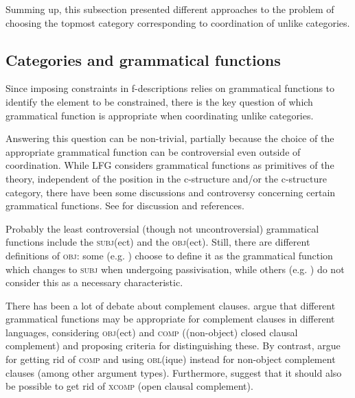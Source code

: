 \documentclass[output=paper]{../langscibook}
\begin{document}
Summing up, this subsection presented different approaches
to the problem of choosing the topmost category corresponding to
coordination of unlike categories.

\subsection{Categories and grammatical functions}
\label{sec:Coordination:unlikes:GF}

Since
imposing constraints in f-descriptions relies on grammatical
functions to identify the element to be constrained, there is the
key question of which grammatical function is appropriate when
coordinating unlike categories.

Answering this question can be non-trivial, partially because the
choice of the appropriate grammatical function can be controversial
even outside of coordination. While LFG considers grammatical
functions as primitives of the theory, independent of the position in the
c-structure and/or the c-structure category, there have been some
discussions and controversy concerning certain grammatical functions.
%
See  for discussion and references.

\hspace*{-4.1pt}Probably the least controversial (though not uncontroversial)
grammatical functions include
the \textsc{subj}(ect) and the \textsc{obj}(ect). Still, there are
different definitions of \textsc{obj}: some (e.g. \citet{Patejuk2015}) choose to define it as the
grammatical function which changes to \textsc{subj} when undergoing
passivisation, while others (e.g. \citet{borjvinc08}) do not
consider this as a necessary characteristic.

There has been a lot of debate about
complement clauses. \citet{DL00} argue that different
grammatical functions may be appropriate for complement clauses in
different languages, considering \textsc{obj}(ect) and
\textsc{comp} ((non-object) closed clausal complement)
and proposing criteria for distinguishing these. By contrast,
\citet{AMM05} argue for getting rid of \textsc{comp}
and using \textsc{obl}(ique) instead for
non-object complement clauses (among other argument
types). Furthermore, \citet{AMM05} suggest that it should also
be possible to get rid of \textsc{xcomp} (open clausal complement).
\end{document}
